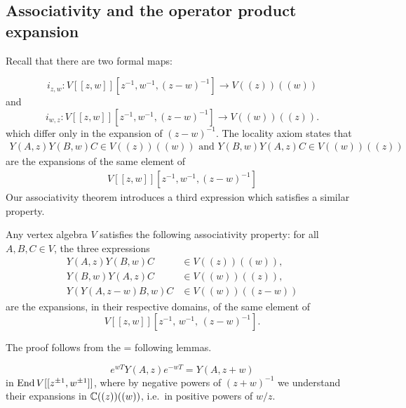 \documentclass[12pt]{article}
\begin{document}
\subsection{Associativity and the operator product expansion}
Recall that there are two formal maps:

\[i_{z,w} : V[[z,w]][z^{-1},w^{-1},(z-w)^{-1}] \longrightarrow V((z))((w))\]
and
\[
    i_{w,z} : V[[z,w]][z^{-1},w^{-1},(z-w)^{-1}] \longrightarrow V((w))((z)).
\]
which differ only in the expansion of $(z-w)^{-1}$. The locality axiom states that \begin{align*}
    Y(A,z)Y(B,w)C \in V((z))((w)) \text{ and } Y(B,w)Y(A,z)C \in V((w))((z))
\end{align*} are the expansions of the same element of \begin{align*}
    V[[z,w]][z^{-1},w^{-1},(z-w)^{-1}]
\end{align*} Our associativity theorem introduces a third expression which satisfies a similar property.

\begin{theorem}[Associativity]
    Any vertex algebra $V$ satisfies the following associativity property:
    for all $A,B,C \in V$, the three expressions
    \begin{align*}
        Y(A,z)Y(B,w)C   & \in V((z))((w)),  \\[4pt]
        Y(B,w)Y(A,z)C   & \in V((w))((z)),  \\[4pt]
        Y(Y(A,z-w)B,w)C & \in V((w))((z-w))
    \end{align*}
    are the expansions, in their respective domains, of the same element of
    \[
        V[[z,w]][z^{-1},\,w^{-1},\,(z-w)^{-1}].
    \]
\end{theorem}
The proof follows from the = following lemmas.
\begin{lemma}
    \label{lemma:translation}
    \[
        e^{wT} Y(A,z) e^{-wT} = Y(A,z+w)
    \]
    in $\operatorname{End} V[[z^{\pm1}, w^{\pm1}]]$, where by negative powers of $(z+w)^{-1}$ we understand their
    expansions in $\mathbb{C}((z))((w))$, i.e.\ in positive powers of $w/z$.
\end{lemma}
\end{document}
